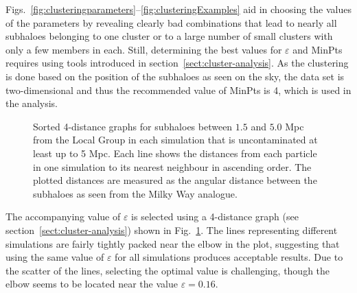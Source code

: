 \documentclass[english, twoside]{HYgradu}
\begin{document}
Figs.~\ref{fig:clusteringparameters}--\ref{fig:clusteringExamples} aid in choosing the values of the parameters by revealing clearly bad combinations that lead to nearly all subhaloes belonging to one cluster or to a large number of small clusters with only a few members in each. Still, determining the best values for $\varepsilon$ and MinPts requires using tools introduced in section~\ref{sect:cluster-analysis}. As the clustering is done based on the position of the subhaloes as seen on the sky, the data set is two-dimensional and thus the recommended value of MinPts is 4, which is used in the analysis.

\begin{figure}
    \centering
    
    \caption{Sorted 4-distance graphs for subhaloes between $1.5$ and $5.0$ Mpc from the Local Group in each simulation that is uncontaminated at least up to 5 Mpc. Each line shows the distances from each particle in one simulation to its  nearest neighbour in ascending order. The plotted distances are measured as the angular distance between the subhaloes as seen from the Milky Way analogue. %
    }\label{fig:4-distances}
\end{figure}

The accompanying value of $\varepsilon$ is selected using a 4-distance graph (see section~\ref{sect:cluster-analysis}) shown in Fig.~\ref{fig:4-distances}. The lines representing different simulations are fairly tightly packed near the elbow in the plot, suggesting that using the same value of $\varepsilon$ for all simulations produces acceptable results. Due to the scatter of the lines, selecting the optimal value is challenging, though the elbow seems to be located near the value $\varepsilon = 0.16$.
\end{document}
